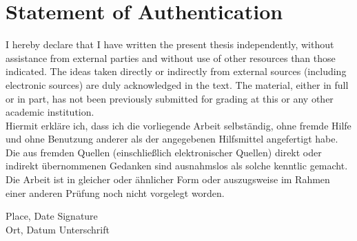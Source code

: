 \chapter* {Statement of Authentication}

I hereby declare that I have written the present thesis independently, without assistance from external parties and without use of other resources than those indicated. The ideas taken directly or indirectly from external sources (including electronic sources) are duly acknowledged in the text. The material, either in full or in part, has not been previously submitted for grading at this or any other academic institution.\\[1cm]

\noindent Hiermit erkläre ich, dass ich die vorliegende Arbeit selbständig, ohne fremde Hilfe und ohne Benutzung anderer als der angegebenen Hilfsmittel angefertigt habe. Die aus fremden Quellen (einschließlich elektronischer Quellen) direkt oder indirekt übernommenen Gedanken sind ausnahmslos als solche kenntlic  gemacht. Die Arbeit ist in gleicher oder ähnlicher Form oder auszugsweise im Rahmen einer anderen Prüfung noch nicht vorgelegt worden.\\[3cm]


\begin {flushleft}
	Place, Date \hspace{4.1cm}Signature\\
	\noindent Ort, Datum \hspace{4cm}Unterschrift\\
\end {flushleft}